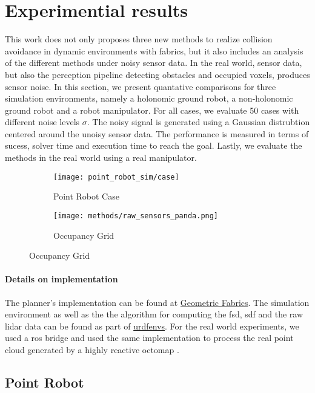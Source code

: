 \section{Experimential results}
\label{sec:results}

This work does not only proposes three new methods to realize collision
avoidance in dynamic environments with \ac{fabrics}, but it also includes an
analysis of the different methods under noisy sensor data. In the real world, 
sensor data, but also the perception pipeline detecting obstacles and occupied
voxels, produces sensor noise. In this section, we present quantative
comparisons for three simulation environments, namely a holonomic ground robot,
a non\hyp{}holonomic ground robot and a robot manipulator. For all cases, we evaluate
50 cases with different noise levels $\sigma$. The noisy signal is generated
using a Gaussian distrubtion centered around the unoisy sensor data. 
The performance is measured 
in terms of sucess, solver time and execution time to reach the goal. Lastly, 
we evaluate the methods in the real world using a real manipulator.

\begin{figure}
  \begin{subfigure}{0.5\linewidth}
    \texttt{[image: point\_robot\_sim/case]}
    \caption{Point Robot Case}
    \label{fig:point_robot_case}
  \end{subfigure}%
  \begin{subfigure}{0.5\linewidth}
    \texttt{[image: methods/raw\_sensors\_panda.png]}
    \caption{Occupancy Grid}
    \label{fig:panda_raw_sensors}
  \end{subfigure}%
\end{figure}


\paragraph{Details on implementation}
The planner's implementation can be found at
\href{www.github.com/tud-amr/fabrics}{Geometric Fabrics}. The simulation
environment as well as the the algorithm for computing the \ac{fsd}, \ac{sdf}
and the raw lidar data can be found as part of
\href{www.github.com/maxspahn/gym_envs_urdf}{urdfenvs}. For the real world
experiments, we used a ros bridge and used the same
implementation to process the real point cloud generated by
a highly reactive octomap \cite{Hornung2013}.

\subsection{Point Robot}
\label{sub:point_robot}

